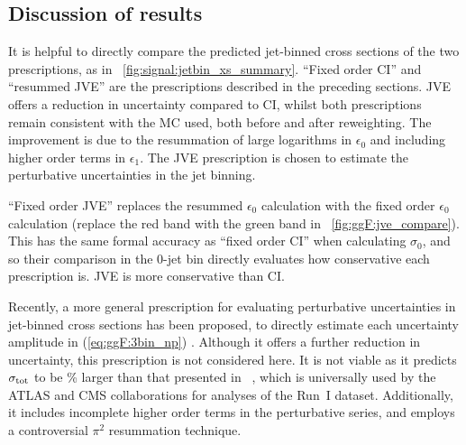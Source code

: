 \subsection{Discussion of results}

It is helpful to directly compare the predicted jet-binned cross sections of the two 
prescriptions, as in \Figure~\ref{fig:signal:jetbin_xs_summary}. ``Fixed order CI'' and 
``resummed JVE'' are the prescriptions described in the preceding sections. JVE offers a 
reduction in uncertainty compared to CI, whilst both prescriptions remain consistent with 
the  MC used, both before and after \ptH reweighting. The 
improvement is due to the resummation of large logarithms in $\epsilon_0$ and including 
higher order terms in $\epsilon_1$. The JVE prescription is chosen to estimate the 
perturbative uncertainties in the jet binning.

``Fixed order JVE'' replaces the resummed $\epsilon_0$ calculation with the fixed order 
$\epsilon_0$ calculation (\ie replace the red band with the green band in 
\Figure~\ref{fig:ggF:jve_compare}). This has the same formal accuracy as ``fixed order CI'' 
when calculating $\sigma_0$, and so their comparison in the 0-jet bin directly evaluates 
how conservative each prescription is. JVE is more conservative than CI.

Recently, a more general prescription for evaluating perturbative uncertainties in 
jet-binned cross sections has been proposed, to directly estimate each uncertainty 
amplitude in (\ref{eq:ggF:3bin_np}) \cite{BLTPW:2013}. Although it offers a further 
reduction in uncertainty, this prescription is not considered here. It is not viable as 
it predicts $\sigma_{\text{tot}}$ to be \% larger than that presented in 
\Reference~\cite{YR3}, which is universally used by the ATLAS and CMS collaborations for 
analyses of the Run~I dataset. Additionally, it includes incomplete higher order terms in 
the perturbative series, and employs a controversial $\pi^2$ resummation technique.

